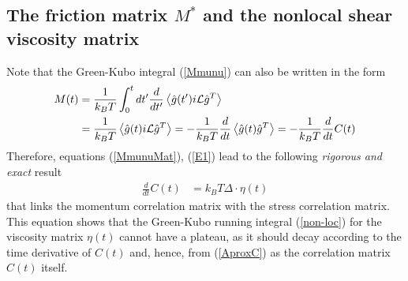 \documentclass[b5paper,openright,10pt]{book}
\newcommand{\esc}{\!\cdot\!}
\newcommand{\llangle}{\left\langle}
\newcommand{\rrangle}{\right\rangle}
\begin{document}
\subsection{The  friction   matrix  $M^*$  and  the   nonlocal  shear viscosity matrix}

Note that the Green-Kubo integral (\ref{Mmunu}) can also be written
in the form
\begin{align}
    M(t)&= \frac{1}{k_BT} \int_0^t dt'\frac{d}{dt'}\llangle \hat{g}(t') i{\cal L}\hat{g}^T\rrangle
\nonumber\\
&= \frac{1}{k_BT} \llangle \hat{g}(t) i{\cal L}\hat{g}^T\rrangle
=  -\frac{1}{k_BT}\frac{d}{dt}\llangle \hat{g}(t) \hat{g}^T\rrangle=-\frac{1}{k_BT}\frac{d}{dt}C(t)
\label{E1}
\end{align}
Therefore,  equations  (\ref{MmunuMat}), (\ref{E1})  lead  to  the  following
\textit{rigorous and exact} result
\begin{align}
\frac{d}{dt}C(t)&= k_BT \Delta\esc \eta(t)
\label{etaExact}
\end{align}
that links the momentum correlation matrix with the stress correlation
matrix.  This  equation shows  that  the  Green-Kubo running  integral
(\ref{non-loc})  for  the viscosity  matrix  $\eta(t)$  cannot have  a
plateau, as it should decay according to the time derivative of $C(t)$
and,  hence, from  (\ref{AproxC})  as the  correlation matrix  $C(t)$
itself.
\end{document}
